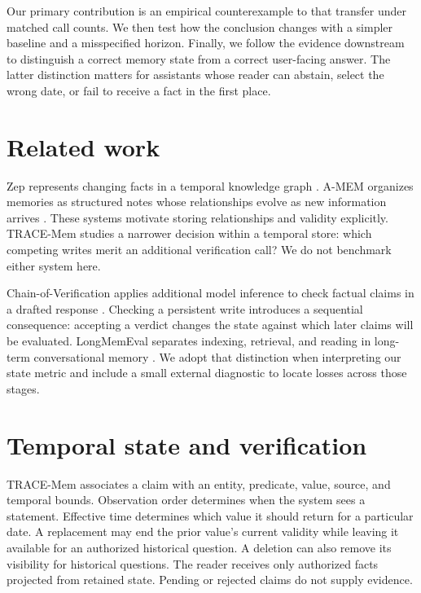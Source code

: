 \documentclass[11pt]{article}
\begin{document}
Our primary contribution is an empirical counterexample to that transfer under matched call counts. We then test how the conclusion changes with a simpler baseline and a misspecified horizon. Finally, we follow the evidence downstream to distinguish a correct memory state from a correct user-facing answer. The latter distinction matters for assistants whose reader can abstain, select the wrong date, or fail to receive a fact in the first place.

\section{Related work}

Zep represents changing facts in a temporal knowledge graph \cite{rasmussen2025zep}. A-MEM organizes memories as structured notes whose relationships evolve as new information arrives \cite{xu2025amem}. These systems motivate storing relationships and validity explicitly. TRACE-Mem studies a narrower decision within a temporal store: which competing writes merit an additional verification call? We do not benchmark either system here.

Chain-of-Verification applies additional model inference to check factual claims in a drafted response \cite{dhuliawala2024cove}. Checking a persistent write introduces a sequential consequence: accepting a verdict changes the state against which later claims will be evaluated. LongMemEval separates indexing, retrieval, and reading in long-term conversational memory \cite{wu2025longmemeval}. We adopt that distinction when interpreting our state metric and include a small external diagnostic to locate losses across those stages.

\section{Temporal state and verification}

TRACE-Mem associates a claim with an entity, predicate, value, source, and temporal bounds. Observation order determines when the system sees a statement. Effective time determines which value it should return for a particular date. A replacement may end the prior value’s current validity while leaving it available for an authorized historical question. A deletion can also remove its visibility for historical questions. The reader receives only authorized facts projected from retained state. Pending or rejected claims do not supply evidence.
\end{document}

